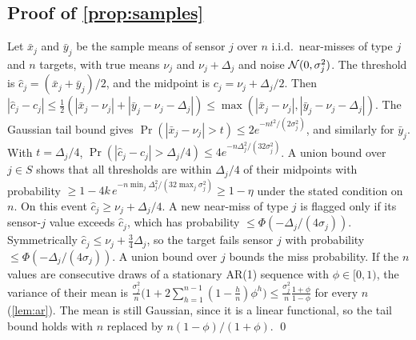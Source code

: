 \subsection{Proof of \texorpdfstring{\cref{prop:samples}}{Proposition 7}}
Let $\bar x_j$ and $\bar y_j$ be the sample means of sensor $j$ over $n$ i.i.d.\ near-misses of type $j$ and $n$ targets, with true means $\nu_j$ and $\nu_j+\Delta_j$ and noise $\mathcal{N}(0,\sigma_j^2)$. The threshold is $\hat c_j=(\bar x_j+\bar y_j)/2$, and the midpoint is $c_j=\nu_j+\Delta_j/2$. Then $|\hat c_j-c_j|\le\frac12(|\bar x_j-\nu_j|+|\bar y_j-\nu_j-\Delta_j|)\le\max(|\bar x_j-\nu_j|,|\bar y_j-\nu_j-\Delta_j|)$. The Gaussian tail bound gives $\Pr(|\bar x_j-\nu_j|>t)\le2e^{-nt^2/(2\sigma_j^2)}$, and similarly for $\bar y_j$. With $t=\Delta_j/4$, $\Pr(|\hat c_j-c_j|>\Delta_j/4)\le4e^{-n\Delta_j^2/(32\sigma_j^2)}$. A union bound over $j\in S$ shows that all thresholds are within $\Delta_j/4$ of their midpoints with probability $\ge1-4k\,e^{-n\min_j\Delta_j^2/(32\max_j\sigma_j^2)}\ge1-\eta$ under the stated condition on $n$. On this event $\hat c_j\ge\nu_j+\Delta_j/4$. A new near-miss of type $j$ is flagged only if its sensor-$j$ value exceeds $\hat c_j$, which has probability $\le\Phi(-\Delta_j/(4\sigma_j))$. Symmetrically $\hat c_j\le\nu_j+\frac34\Delta_j$, so the target fails sensor $j$ with probability $\le\Phi(-\Delta_j/(4\sigma_j))$. A union bound over $j$ bounds the miss probability. If the $n$ values are consecutive draws of a stationary AR(1) sequence with $\phi\in[0,1)$, the variance of their mean is $\frac{\sigma_j^2}{n}\big(1+2\sum_{h=1}^{n-1}(1-\frac hn)\phi^h\big)\le\frac{\sigma_j^2}{n}\frac{1+\phi}{1-\phi}$ for every $n$ (\cref{lem:ar}). The mean is still Gaussian, since it is a linear functional, so the tail bound holds with $n$ replaced by $n(1-\phi)/(1+\phi)$. \qed

